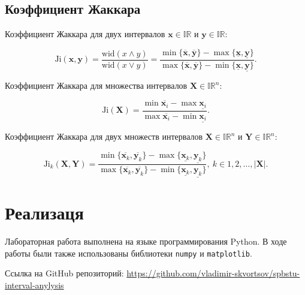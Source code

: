 \documentclass{article}
\begin{document}
  \subsection{Коэффициент Жаккара}

  Коэффициент Жаккара для двух интервалов \( \mathbf{x} \in \mathbb{IR} \)
  и \( \mathbf{y} \in \mathbb{IR} \):

  \begin{equation}
    \text{Ji} (\mathbf{x}, \mathbf{y})
      = \frac{\text{wid} (x \land y)}{\text{wid} (x \lor y)}
      = \frac{\min \{ \overline{\mathbf{x}}, \overline{\mathbf{y}} \} - \max \{ \underline{\mathbf{x}}, \underline{\mathbf{y}} \}}
        {\max\{ \overline{\mathbf{x}}, \overline{\mathbf{y}} \} - \min \{ \underline{\mathbf{x}}, \underline{\mathbf{y}} \}}.
  \end{equation}

  Коэффициент Жаккара для множества интервалов
  \( \mathbf{X} \in \mathbb{IR}^n \):

  \begin{equation}
    \text{Ji} (\mathbf{X})
      = \frac{\min \overline{\mathbf{x}_i} - \max \underline{\mathbf{x}_i}}
        {\max \overline{\mathbf{x}_i} - \min \underline{\mathbf{x}_i}}.
  \end{equation}

  Коэффициент Жаккара для двух множеств интервалов
  \( \mathbf{X} \in \mathbb{IR}^n \) и \( \mathbf{Y} \in \mathbb{IR}^n \):

  \begin{equation}
    \text{Ji}_k (\mathbf{X}, \mathbf{Y})
      = \frac{\min \{ \overline{\mathbf{x}_k}, \overline{\mathbf{y}_k} \} - \max \{ \underline{\mathbf{x}_k}, \underline{\mathbf{y}_k} \}}
        {\max\{ \overline{\mathbf{x}_k}, \overline{\mathbf{y}_k} \} - \min \{ \underline{\mathbf{x}_k}, \underline{\mathbf{y}_k} \}},
      \ k \in 1, 2, \dots, |\mathbf{X}|.
  \end{equation}

  \section{Реализаця}

  Лабораторная работа выполнена на языке программирования Python. В ходе
  работы были также использованы библиотеки \verb!numpy! и
  \verb!matplotlib!.

  Ссылка на GitHub репозиторий:
  \href{https://github.com/vladimir-skvortsov/spbstu-interval-anylysis}
  {https://github.com/vladimir-skvortsov/spbstu-interval-anylysis}
\end{document}
